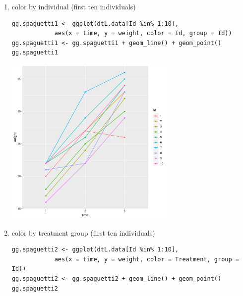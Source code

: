\documentclass{article}
\begin{document}
\begin{enumerate}
\item color by individual (first ten individuals)
\label{sec:orgf0e7630}

\lstset{language=r,label= ,caption= ,captionpos=b,numbers=none}
\begin{lstlisting}
gg.spaguetti1 <- ggplot(dtL.data[Id %in% 1:10], 
			aes(x = time, y = weight, color = Id, group = Id))
gg.spaguetti1 <- gg.spaguetti1 + geom_line() + geom_point()
gg.spaguetti1
\end{lstlisting}

\begin{center}
\includegraphics[width=0.65\textwidth]{./figures/fig-spaguetti1.pdf}
\end{center}


\clearpage

\item color by treatment group (first ten individuals)
\label{sec:orgd11d602}

\lstset{language=r,label= ,caption= ,captionpos=b,numbers=none}
\begin{lstlisting}
gg.spaguetti2 <- ggplot(dtL.data[Id %in% 1:10],
			aes(x = time, y = weight, color = Treatment, group = Id))
gg.spaguetti2 <- gg.spaguetti2 + geom_line() + geom_point()
gg.spaguetti2
\end{lstlisting}


\end{enumerate}
\end{document}
